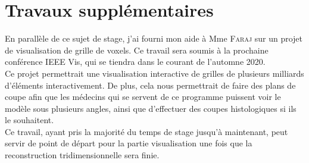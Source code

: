 \documentclass[utf8]{stageM2R}
\begin{document}
{		\section{Travaux supplémentaires}
		{
			En parallèle de ce sujet de stage, j'ai fourni mon aide à Mme \textsc{Faraj} sur un projet de visualisation de grille de voxels. Ce travail sera soumis à la prochaine conférence IEEE Vis, qui se tiendra dans le courant de l'automne 2020.\\

			Ce projet permettrait une visualisation interactive de grilles de plusieurs milliards d'éléments interactivement. De plus, cela nous permettrait de faire des plans de coupe afin que les médecins qui se servent de ce programme puissent voir le modèle sous plusieurs angles, ainsi que d'effectuer des coupes histologiques si ils le souhaitent.\\

			Ce travail, ayant pris la majorité du temps de stage jusqu'à maintenant, peut servir de point de départ pour la partie visualisation une fois que la reconstruction tridimensionnelle sera finie.
		}
	}

	{}
	
\end{document}
